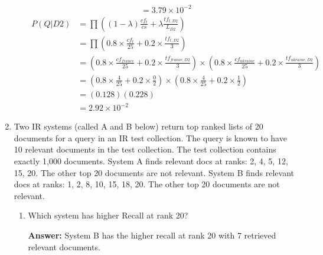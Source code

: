 \documentclass[11pt]{article}
\begin{document}
\begin{enumerate}
\begin{enumerate}
\begin{align*}
                          & = 3.79 \times 10^{-2}
                \end{align*}
                \begin{align*}
                  P(Q|D2) & = \prod \left((1 - \lambda) \frac{cf_{t}}{cs} + \lambda \frac{tf_{t,D2}}{L_{D2}}\right)                                                                                          \\
                          & = \prod \left(0.8\times \frac{cf_{t}}{25} + 0.2\times \frac{tf_{t,D2}}{3}\right)                                                                                                 \\
                          & = \left(0.8\times \frac{cf_{france}}{25} + 0.2\times \frac{tf_{france,D2}}{3}\right) \times \left(0.8\times \frac{cf_{ukraine}}{25} + 0.2\times \frac{tf_{ukraine,D2}}{3}\right) \\
                          & = \left(0.8\times \frac{4}{25} + 0.2\times \frac{0}{2}\right) \times \left(0.8\times \frac{4}{25} + 0.2\times \frac{1}{2}\right)                                                 \\
                          & = (0.128)(0.228)                                                                                                                                                                 \\
                          & = 2.92 \times 10^{-2}
                \end{align*}

        \end{enumerate}

  \item Two IR systems (called A and B below) return top ranked lists of 20 documents for a query in an IR test collection. The query is known to have 10 relevant documents in the test collection. The test collection contains exactly 1,000 documents.
        System A finds relevant docs at ranks: 2, 4, 5, 12, 15, 20. The other top 20 documents are not relevant.
        System B finds relevant docs at ranks: 1, 2, 8, 10, 15, 18, 20. The other top 20 documents are not relevant.

        \begin{enumerate}
          \item Which system has higher Recall at rank 20?

                \textbf{Answer:} System B has the higher recall at rank 20 with 7 retrieved relevant documents.


\end{enumerate}
\end{enumerate}
\end{document}
